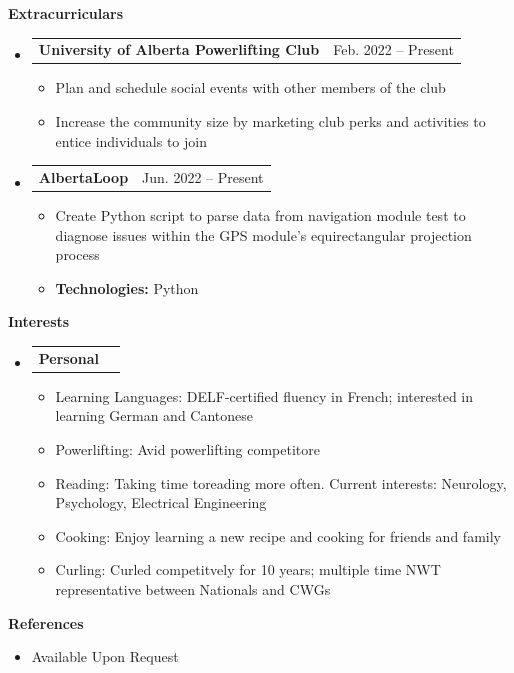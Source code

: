 \documentclass[letterpaper,12pt]{article}[leftmargin=*]
\makeatletter
\def \entryspacing {-0pt}
\renewcommand{\section}[2]{\vspace{5pt}
  \colorbox{secondary}{\color{white}\raggedbottom\normalsize\textbf{{#1}{\hspace{7pt}#2}}}
}
\newcommand{\resumeEntryStart}{\begin{itemize}[leftmargin=2.5mm]}
\newcommand{\resumeEntryEnd}{\end{itemize}\vspace{\entryspacing}}
\newcommand{\resumeItemListStart}{\begin{itemize}[leftmargin=4.5mm]}
\newcommand{\resumeItemListEnd}{\end{itemize}}
\newcommand{\resumeItem}[1]{
  \item\small{
    {#1 \vspace{-2pt}}
  }
}
\newcommand{\resumeEntryTD}[2]{
  \vspace{-1pt}\item[]
    \begin{tabularx}{0.97\textwidth}{X@{\hspace{60pt}}r}
      \textbf{\color{primary}#1} & {\firabook\color{accent}\small#2} \\
    \end{tabularx}\vspace{-6pt}
}
\newcommand{\resumeEntryS}[2]{
  \item[]\small{
    \textbf{\color{primary}#1 }{ #2 \vspace{-6pt}}
  }
}
\makeatother
\begin{document}
\section{\faGroup}{Extracurriculars}

 \resumeEntryStart
  \resumeEntryTD{University of Alberta Powerlifting Club}{Feb. 2022 -- Present}
    \resumeItemListStart
      \resumeItem{Plan and schedule social events with other members of the club}
      \resumeItem{Increase the community size by marketing club perks and activities to entice individuals to join} 
    \resumeItemListEnd
 \resumeEntryEnd

 \resumeEntryStart
 \resumeEntryTD{AlbertaLoop}{Jun. 2022 -- Present}
 \resumeItemListStart
      \resumeItem {Create Python script to parse data from navigation module test to diagnose issues within the GPS module's equirectangular projection process}
      \resumeItem {\textbf{Technologies:} Python}
    \resumeItemListEnd
 \resumeEntryEnd

\section{\faGamepad}{Interests}
\resumeEntryStart
\resumeEntryTD{Personal}{}%
   \resumeItemListStart
   \resumeItem{Learning Languages: DELF-certified fluency in French; interested in learning German and Cantonese}
   \resumeItem{Powerlifting: Avid powerlifting competitore}
   \resumeItem{Reading: Taking time toreading more often. Current interests: Neurology, Psychology, Electrical Engineering}
   \resumeItem{Cooking: Enjoy learning a new recipe and cooking for friends and family}
   \resumeItem{Curling: Curled competitvely for 10 years; multiple time NWT representative between Nationals and CWGs}

   \resumeItemListEnd
 \resumeEntryEnd
\section{\faEnvelope}{References}

 \resumeEntryStart
  \resumeEntryS{}{Available Upon Request}
 \resumeEntryEnd
\end{document}
